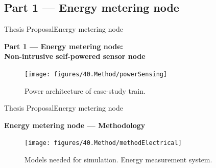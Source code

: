 

		



\subsection{Part 1 --- Energy metering node}


\begin{frame}{Thesis Proposal}{Energy metering node}
\begin{block}{\textbf{Part 1 --- Energy metering node: \\ \small{Non-intrusive self-powered sensor node}}}
	\begin{figure}[ht!]
		\centering
		\texttt{[image: figures/40.Method/powerSensing]}
		\caption{Power architecture of case-study train.}
	\end{figure}
\end{block}
\end{frame}

\begin{frame}{Thesis Proposal}{Energy metering node}
\begin{block}{\textbf{Energy metering node --- Methodology}}

	\begin{figure}[ht!]
		\centering
		\texttt{[image: figures/40.Method/methodElectrical]}
		\caption{Models needed for simulation. Energy measurement system.}
	\end{figure}

\end{block}
\end{frame}

